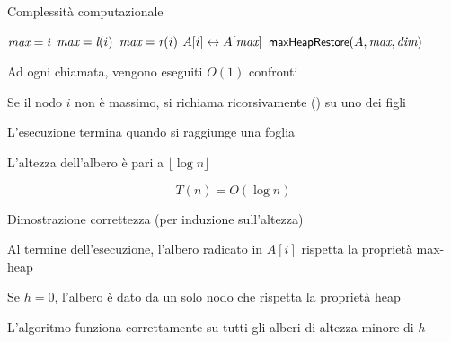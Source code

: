 \begin{frame}{Complessità computazionale}


\begin{overprint}
\begin{Procedure}
\caption[A]{\maxheapify($\Item[\,]\ A$, \INTEGER $i$, \INTEGER \heapcount)}

\INTEGER $\textit{max} = i$\;
{
  $\textit{max} = \textit{l}(i)$
}
{
  $\textit{max} = \textit{r}(i)$
}
{
  $A[i] \leftrightarrow A[\textit{max}]$\;
  $\textsf{{\small maxHeapRestore}}(A, \textit{max}, \textit{dim})$\;
}
\end{Procedure}
\vspace{12pt}
\BI
\item Ad ogni chiamata, vengono eseguiti $O(1)$ confronti
\item Se il nodo $i$ non è massimo, si richiama ricorsivamente
\maxheapify() su uno dei figli 
\item L'esecuzione termina quando si raggiunge una foglia
\item L'altezza dell'albero è pari a $\lfloor \log n \rfloor$

\EI
{}
\[
  T(n) = O(\log n)
\]
\end{overprint}

\end{frame}

\begin{frame}{Dimostrazione correttezza (per induzione sull'altezza)}

\vspace{-9pt}
\begin{myboxtitle}[Teorema]
Al termine dell'esecuzione, l'albero radicato in $A[i]$
rispetta la proprietà max-heap
\end{myboxtitle}

\pause
\begin{myboxtitle}[Caso base: altezza $h=0$]
Se $h=0$, l'albero è dato da un solo nodo che rispetta la
proprietà heap
\end{myboxtitle}

\begin{myboxtitle}
L'algoritmo funziona correttamente su tutti gli alberi di altezza minore di $h$
\end{myboxtitle}

\end{frame}

